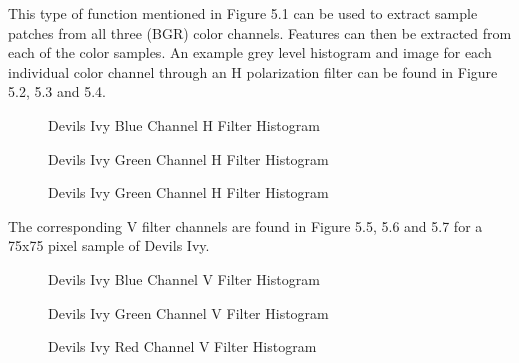 This type of function mentioned in Figure 5.1 can be used to extract sample patches from all three (BGR) color channels. Features can then be extracted from each of the color samples.  An example grey level histogram and image for each individual color channel through an H polarization filter can be found in Figure 5.2, 5.3 and 5.4.
\begin{figure}
    \begin{center}
    \end{center}
    \caption{Devils Ivy Blue Channel H Filter Histogram}
    \label{fig:polarization}
\end{figure}
\begin{figure}
    \begin{center}
    \end{center}
    \caption{Devils Ivy Green Channel H Filter Histogram}
    \label{fig:polarization}
\end{figure}
\begin{figure}
    \begin{center}
    \end{center}
    \caption{Devils Ivy Green Channel H Filter Histogram}
    \label{fig:polarization}
\end{figure}
The corresponding V filter channels are found in Figure 5.5, 5.6 and 5.7 for a 75x75 pixel sample of Devils Ivy.
\begin{figure}
    \begin{center}
    \end{center}
    \caption{Devils Ivy Blue Channel V Filter Histogram}
    \label{fig:polarization}
\end{figure}
\begin{figure}
    \begin{center}
    \end{center}
    \caption{Devils Ivy Green Channel V Filter Histogram}
    \label{fig:polarization}
\end{figure}
\begin{figure}
    \begin{center}
    \end{center}
    \caption{Devils Ivy Red Channel V Filter Histogram}
    \label{fig:polarization}
\end{figure}
